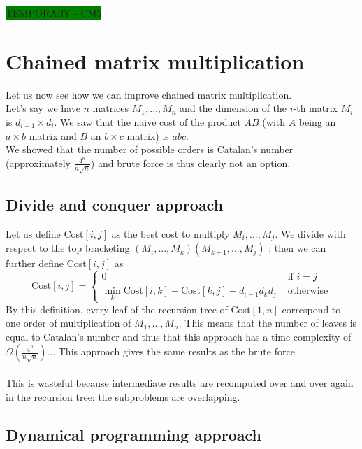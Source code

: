 \colorbox{green}{TEMPORARY - CM5}

\section{Chained matrix multiplication}

Let us now see how we can improve chained matrix multiplication.\\
Let's say we have $n$ matrices $M_1,..., M_n$ and the dimension of the $i$-th matrix $M_i$ is $d_{i-1} \times d_i$. We saw that the naive cost of the product $AB$ (with $A$ being an $a \times b$ matrix and $B$ an $b \times c$ matrix) is $abc$.\\ 

We showed that the number of possible orders is Catalan's number (approximately $\frac{4^n}{n\sqrt{n}}$) and brute force is thus clearly not an option.


\subsection{Divide and conquer approach} 

Let us define Cost$[i,j]$ as the best cost to multiply $M_i,...,M_j$. We divide with respect to the top bracketing $(M_i,...,M_k)(M_{k+1},...,M_j)$ ; then we can further define Cost$[i,j]$ as 
\begin{equation}
 \text{Cost}[i,j] = \begin{cases} 
 	0 & \text{ if } i=j \\
 	\min_k \text{Cost}[i,k] + \text{Cost}[k,j] + d_{i-1}d_kd_j & \text{ otherwise}
 \end{cases}
 \label{eq1}
\end{equation}
By this definition, every leaf of the recursion tree of Cost$[1,n]$ correspond to one order of multiplication of $M_1,...,M_n$. This means that the number of leaves is equal to Catalan's number and thus that this approach has a time complexity of $\Omega  (\frac{4^n}{n\sqrt{n}})$... This approach gives the same results as the brute force. 
\\ \\
This is wasteful because intermediate results are recomputed over and over again in the recursion tree: the subproblems are overlapping.

\subsection{Dynamical programming approach}

